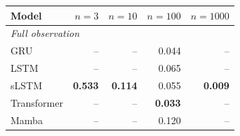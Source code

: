 \begin{tabular}{lrrrr}
\toprule
Model & $n{=}3$ & $n{=}10$ & $n{=}100$ & $n{=}1000$ \\
\midrule
\multicolumn{5}{l}{\emph{Full observation}} \\
GRU & -- & -- & 0.044 & -- \\
LSTM & -- & -- & 0.065 & -- \\
sLSTM & \textbf{0.533} & \textbf{0.114} & 0.055 & \textbf{0.009} \\
Transformer & -- & -- & \textbf{0.033} & -- \\
Mamba & -- & -- & 0.120 & -- \\
\bottomrule
\end{tabular}
